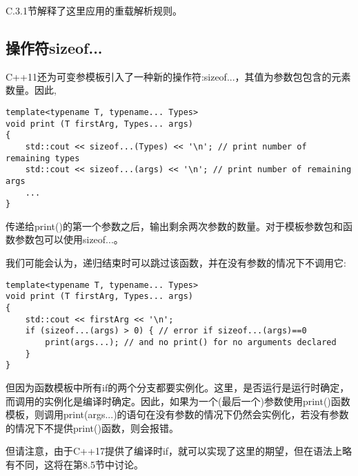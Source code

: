C.3.1节解释了这里应用的重载解析规则。

\subsection{操作符sizeof...}

C++11还为可变参模板引入了一种新的操作符:sizeof...，其值为参数包包含的元素数量。因此,

\begin{lstlisting}[style=styleCXX]
template<typename T, typename... Types>
void print (T firstArg, Types... args)
{
	std::cout << sizeof...(Types) << '\n'; // print number of remaining types
	std::cout << sizeof...(args) << '\n'; // print number of remaining args
	...
}
\end{lstlisting}

传递给print()的第一个参数之后，输出剩余两次参数的数量。对于模板参数包和函数参数包可以使用sizeof...。

我们可能会认为，递归结束时可以跳过该函数，并在没有参数的情况下不调用它:

\begin{lstlisting}[style=styleCXX]
template<typename T, typename... Types>
void print (T firstArg, Types... args)
{
	std::cout << firstArg << '\n';
	if (sizeof...(args) > 0) { // error if sizeof...(args)==0
		print(args...); // and no print() for no arguments declared
	}
}
\end{lstlisting}

但因为函数模板中所有if的两个分支都要实例化。这里，是否运行是运行时确定，而调用的实例化是编译时确定。因此，如果为一个(最后一个)参数使用print()函数模板，则调用print(args...)的语句在没有参数的情况下仍然会实例化，若没有参数的情况下不提供print()函数，则会报错。

但请注意，由于C++17提供了编译时if，就可以实现了这里的期望，但在语法上略有不同，这将在第8.5节中讨论。
























